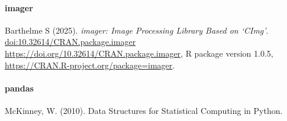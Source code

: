 \documentclass[
]{article}
\begin{document}
\paragraph{imager}\label{imager}

Barthelme S (2025). \emph{imager: Image Processing Library Based on
`CImg'}. \url{doi:10.32614/CRAN.package.imager}
\url{https://doi.org/10.32614/CRAN.package.imager}, R package version
1.0.5, \url{https://CRAN.R-project.org/package=imager}.

\paragraph{pandas}\label{pandas}

McKinney, W. (2010). Data Structures for Statistical Computing in
Python.
\end{document}
